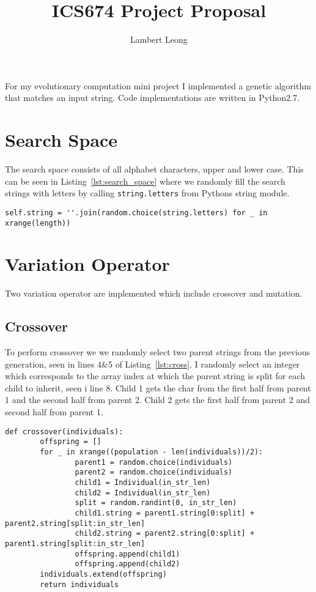 \documentclass[conference]{IEEEtrans}
\date{}
\title{ICS674 Project Proposal}
\author{Lambert Leong}
\begin{document}

\maketitle

\iffalse
For my evolutionary computation mini project I implemented a genetic algorithm
that matches an input string.  Code implementations are written in Python2.7.

\section{Search Space}

The search space consists of all alphabet characters, upper and lower case.
This can be seen in Listing~\ref{lst:search_space} where we randomly fill the
search strings with letters by calling \texttt{string.letters} from Pythons
string module.

\begin{lstlisting}[caption = {Search space is all letter characters, upper and
lower case }, label = {lst:search_space}]
self.string = ''.join(random.choice(string.letters) for _ in xrange(length))
\end{lstlisting}

\section{Variation Operator}

Two variation operator are implemented which include crossover and mutation.

\subsection{Crossover}

To perform crossover we we randomly select two parent strings from the previous
generation, seen in lines 4\&5 of Listing~\ref{lst:cross}.  I randomly select an
integer which corresponds to the array index at which the parent string is split
for each child to inherit, seen i line 8.  Child 1 gets the char from the first
half from parent 1 and the second half from parent 2.  Child 2 gets the first
half from parent 2 and second half from parent 1.

\begin{lstlisting}[caption = {Crossover Function}, label = {lst:cross}]
def crossover(individuals):
        offspring = []
        for _ in xrange((population - len(individuals))/2):
                parent1 = random.choice(individuals)
                parent2 = random.choice(individuals)
                child1 = Individual(in_str_len)
                child2 = Individual(in_str_len)
                split = random.randint(0, in_str_len)
                child1.string = parent1.string[0:split] + parent2.string[split:in_str_len]
                child2.string = parent2.string[0:split] + parent1.string[split:in_str_len]
                offspring.append(child1)
                offspring.append(child2)
        individuals.extend(offspring)
        return individuals
\end{lstlisting}
\end{document}
